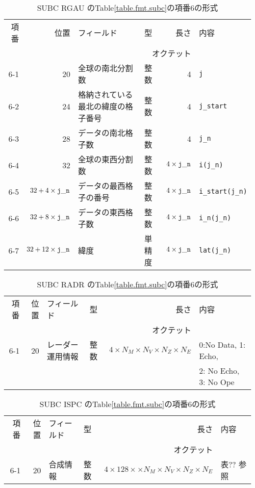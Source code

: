 \begin{table}[htp]
 \begin{center}
  \begin{tabular}{rr|llrl}
 \hline
 項番 & 位置 & フィールド & 型 & 長さ & 内容 \\
      &      &            & \multicolumn{2}{r}{オクテット} &  \\
 \hline
   6-1 & 20 & 全球の南北分割数 & 整数   &     4  & {\tt j} \\
   6-2 & 24 & 格納されている最北の緯度の格子番号 & 整数 & 4  & {\tt j\_start} \\
   6-3 & 28 & データの南北格子数 & 整数 & 4  & {\tt j\_n} \\
   6-4 & 32 & 全球の東西分割数 & 整数 & $4\times {\tt j\_n}$ &
   {\tt i(j\_n)}\\
   6-5 & $32+4\times{\tt j\_n}$ & データの最西格子の番号 & 整数 
   & $4\times {\tt j\_n}$ & {\tt i\_start(j\_n)}\\
   6-6 & $32+8\times{\tt j\_n}$ & データの東西格子数 & 整数
   & $4\times {\tt j\_n}$ & {\tt i\_n(j\_n)}\\
   6-7 & $32+12\times{\tt j\_n}$ & 緯度 & 単精度
   & $4\times {\tt j\_n}$ & {\tt lat(j\_n)}\\
   \hline
  \end{tabular}
 \end{center}
 \caption{SUBC RGAU のTable\ref{table.fmt.subc}の項番6の形式}
 \label{table.fmt.subc.rgau}
\end{table}

\begin{table}[htp]
 \begin{center}
  \begin{tabular}{rr|llrl}
 \hline
 項番 & 位置 & フィールド & 型 & 長さ & 内容 \\
      &      &            & \multicolumn{2}{r}{オクテット} &  \\
 \hline
   6-1 & 20 &レーダー運用情報 & 整数 
   & $4\times N_M \times N_V \times N_Z \times N_E$ & 
   0:No Data, 1: Echo, \\
       &  &  &  &  & 2: No Echo, 3: No Ope \\
   \hline
  \end{tabular}
 \end{center}
 \caption{SUBC RADR のTable\ref{table.fmt.subc}の項番6の形式}
 \label{table.fmt.subc.radr}
\end{table}

\begin{table}[htp]
 \begin{center}
  \begin{tabular}{rr|llrl}
 \hline
 項番 & 位置 & フィールド & 型 & 長さ & 内容 \\
      &      &            & \multicolumn{2}{r}{オクテット} &  \\
 \hline
   6-1 & 20 &合成情報 & 整数 
   & $4 \times 128 \times \times N_M \times N_V \times N_Z \times N_E$ 
   & 表?? 参照\\
   \hline
  \end{tabular}
 \end{center}
 \caption{SUBC ISPC のTable\ref{table.fmt.subc}の項番6の形式}
 \label{table.fmt.subc.ispc}
\end{table}

